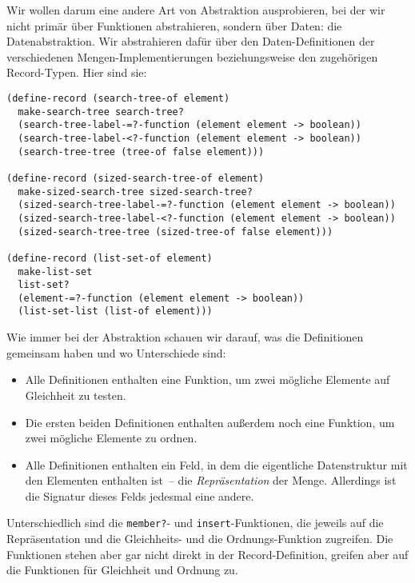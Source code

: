 Wir wollen darum eine andere Art von Abstraktion ausprobieren, bei der
wir nicht primär über Funktionen abstrahieren, sondern über Daten: die
Datenabstraktion.  Wir abstrahieren dafür über
den Daten-Definitionen der verschiedenen Mengen-Implementierungen
beziehungsweise den zugehörigen Record-Typen.  Hier sind sie:
%
\begin{lstlisting}
(define-record (search-tree-of element)
  make-search-tree search-tree?
  (search-tree-label-=?-function (element element -> boolean))
  (search-tree-label-<?-function (element element -> boolean))
  (search-tree-tree (tree-of false element)))

(define-record (sized-search-tree-of element)
  make-sized-search-tree sized-search-tree?
  (sized-search-tree-label-=?-function (element element -> boolean))
  (sized-search-tree-label-<?-function (element element -> boolean))
  (sized-search-tree-tree (sized-tree-of false element)))

(define-record (list-set-of element)
  make-list-set
  list-set?
  (element-=?-function (element element -> boolean))
  (list-set-list (list-of element)))
\end{lstlisting}
%
Wie immer bei der Abstraktion schauen wir darauf, was die Definitionen
gemeinsam haben und wo Unterschiede sind:
%
\begin{itemize}
\item Alle Definitionen enthalten eine Funktion, um zwei mögliche
  Elemente auf Gleichheit zu testen.
\item Die ersten beiden Definitionen enthalten außerdem noch eine
  Funktion, um zwei mögliche Elemente zu ordnen.
\item Alle Definitionen enthalten ein Feld, in dem die eigentliche
  Datenstruktur mit den Elementen enthalten ist~-- die
  \textit{Repräsentation} der Menge.  Allerdings ist die Signatur
  dieses Felds jedesmal eine andere.
\end{itemize}
%
Unterschiedlich sind die \lstinline{member?}- und
\lstinline{insert}-Funktionen, die jeweils auf die Repräsentation und
die Gleichheits- und die Ordnungs-Funktion zugreifen.  Die Funktionen
stehen aber gar nicht direkt in der Record-Definition, greifen aber
auf die Funktionen für Gleichheit und Ordnung zu.

